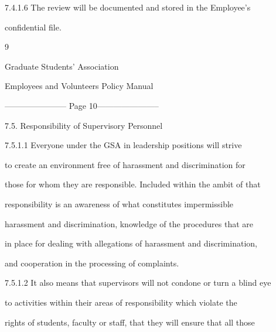   



7.4.1.6 The  review  will  be  documented   and  stored  in  the  Employee’s  

confidential file. 



                                                          9  

  

  

                                    Graduate  Students’ Association  



                          Employees and Volunteers Policy Manual  


----------------------- Page 10-----------------------

                          



                        7.5.      Responsibility of Supervisory Personnel  



  



7.5.1.1 Everyone   under   the   GSA   in   leadership   positions   will   strive   

         to   create   an  environment  free  of  harassment  and  discrimination  for  

         those for whom they are responsible. Included within the ambit of that  

         responsibility   is   an   awareness   of   what   constitutes   impermissible  

         harassment  and  discrimination,  knowledge of  the procedures  that  are  

         in place for dealing with allegations of harassment and discrimination,  

         and cooperation in the processing of complaints.  



  



7.5.1.2 It  also  means  that  supervisors  will  not  condone  or  turn  a  blind  eye  

         to   activities  within  their  areas  of  responsibility  which  violate  the  

         rights  of  students,  faculty or staff,  that  they  will  ensure  that  all  those  

